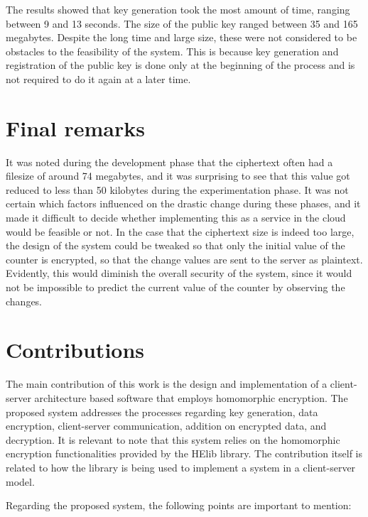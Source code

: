 The results showed that key generation took the most amount of time, ranging between 9 and 13 seconds. The size of the public key ranged between 35 and 165 megabytes. Despite the long time and large size, these were not considered to be obstacles to the feasibility of the system. This is because key generation and registration of the public key is done only at the beginning of the process and is not required to do it again at a later time.

\section{Final remarks}

It was noted during the development phase that the ciphertext often had a filesize of around 74 megabytes, and it was surprising to see that this value got reduced to less than 50 kilobytes during the experimentation phase. It was not certain which factors  influenced on the drastic change during these phases, and it made it difficult to decide whether implementing this as a service in the cloud would be feasible or not. In the case that the ciphertext size is indeed too large, the design of the system could be tweaked so that only the initial value of the counter is encrypted, so that the change values are sent to the server as plaintext. Evidently, this would diminish the overall security of the system, since it would not be impossible to predict the current value of the counter by observing the changes. 

\section{Contributions}

The main contribution of this work is the design and implementation of a client-server architecture based software that employs homomorphic encryption. The proposed system addresses the processes regarding key generation, data encryption, client-server communication, addition on encrypted data, and decryption. It is relevant to note that this system relies on the homomorphic encryption functionalities provided by the HElib library. The contribution itself is related to how the library is being used to implement a system in a client-server model.

Regarding the proposed system, the following points are important to mention:

